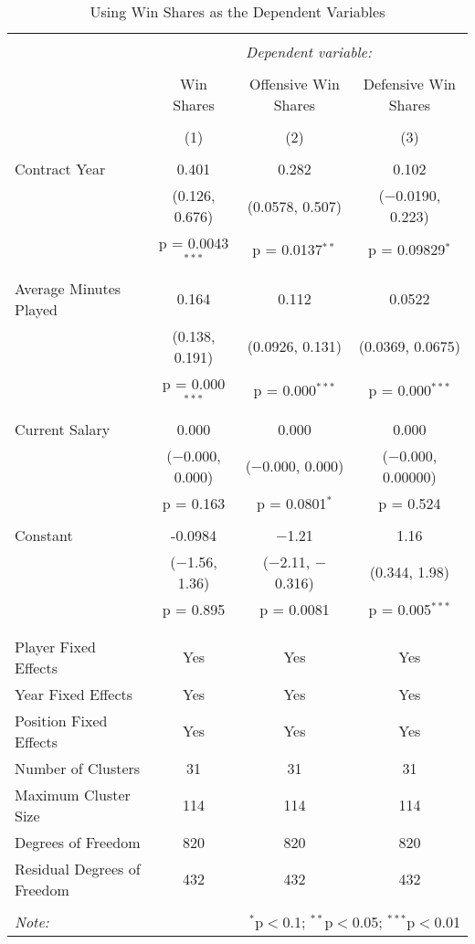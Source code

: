 \documentclass[12pt]{article}
\begin{document}
	
	\begin{sidewaystable}[!htbp] \centering 
		\caption{Using Win Shares as the Dependent Variables} 
		\label{geewinshare} 
		\begin{tabular}{@{\extracolsep{5pt}}lccc} 
			\\[-1.8ex]\hline 
			\hline \\[-1.8ex] 
			& \multicolumn{3}{c}{\textit{Dependent variable:}} \\ 
			\cline{2-4} 
			\\[-1.8ex] & Win Shares & Offensive Win Shares & Defensive Win Shares \\ 
			\\[-1.8ex] & (1) & (2) & (3)\\ 
			\hline \\[-1.8ex] 
			Contract Year & 0.401 & 0.282 & 0.102 \\ 
			& (0.126, 0.676) & (0.0578, 0.507) & ($-$0.0190, 0.223) \\ 
			& p = 0.0043$^{***}$ & p = 0.0137$^{**}$ & p = 0.09829$^{*}$ \\ 
			& & & \\ 
			Average Minutes Played & 0.164 & 0.112 & 0.0522 \\ 
			& (0.138, 0.191) & (0.0926, 0.131) & (0.0369, 0.0675) \\ 
			& p = 0.000$^{***}$ & p = 0.000$^{***}$ & p = 0.000$^{***}$ \\ 
			& & & \\ 
			Current Salary & 0.000 & 0.000 & 0.000 \\ 
			& ($-$0.000, 0.000) & ($-$0.000, 0.000) & ($-$0.000, 0.00000) \\ 
			& p = 0.163 & p = 0.0801$^{*}$ & p = 0.524 \\ 
			& & & \\ 
			Constant & -0.0984 & $-$1.21 & 1.16 \\ 
			& ($-$1.56, 1.36) & ($-$2.11, $-$0.316) & (0.344, 1.98) \\ 
			& p = 0.895 & p = 0.0081 & p = 0.005$^{***}$ \\ 
			& & & \\ 
			\hline \\[-1.8ex] 
			Player Fixed Effects & Yes & Yes & Yes \\ 
			Year Fixed Effects & Yes & Yes & Yes \\ 
			Position Fixed Effects & Yes & Yes & Yes \\ 
			Number of Clusters & 31 & 31 & 31 \\ 
			Maximum Cluster Size & 114 & 114 & 114 \\ 
			Degrees of Freedom & 820 & 820 & 820 \\ 
			Residual Degrees of Freedom & 432 & 432 & 432 \\ 
			\hline 
			\hline \\[-1.8ex] 
			\textit{Note:}  & \multicolumn{3}{r}{$^{*}$p$<$0.1; $^{**}$p$<$0.05; $^{***}$p$<$0.01} \\ 
		\end{tabular} 
	\end{sidewaystable}
\end{document}
